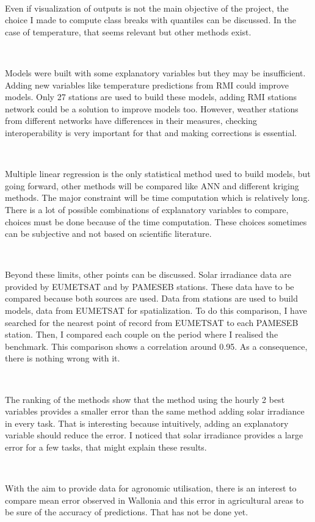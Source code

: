 \documentclass[12pt,twoside]{reedthesis}
\theoremstyle{definition}
\theoremstyle{definition}
\theoremstyle{definition}
\theoremstyle{remark}
\begin{document}
~

Even if visualization of outputs is not the main objective of the
project, the choice I made to compute class breaks with quantiles can be
discussed. In the case of temperature, that seems relevant but other
methods exist.

~

Models were built with some explanatory variables but they may be
insufficient. Adding new variables like temperature predictions from RMI
could improve models. Only 27 stations are used to build these models,
adding RMI stations network could be a solution to improve models too.
However, weather stations from different networks have differences in
their measures, checking interoperability is very important for that and
making corrections is essential.

~

Multiple linear regression is the only statistical method used to build
models, but going forward, other methods will be compared like ANN and
different kriging methods. The major constraint will be time computation
which is relatively long. There is a lot of possible combinations of
explanatory variables to compare, choices must be done because of the
time computation. These choices sometimes can be subjective and not
based on scientific literature.

~

Beyond these limits, other points can be discussed. Solar irradiance
data are provided by EUMETSAT and by PAMESEB stations. These data have
to be compared because both sources are used. Data from stations are
used to build models, data from EUMETSAT for spatialization. To do this
comparison, I have searched for the nearest point of record from
EUMETSAT to each PAMESEB station. Then, I compared each couple on the
period where I realised the benchmark. This comparison shows a
correlation around 0.95. As a consequence, there is nothing wrong with
it.

~

The ranking of the methods show that the method using the hourly 2 best
variables provides a smaller error than the same method adding solar
irradiance in every task. That is interesting because intuitively,
adding an explanatory variable should reduce the error. I noticed that
solar irradiance provides a large error for a few tasks, that might
explain these results.

~

With the aim to provide data for agronomic utilisation, there is an
interest to compare mean error observed in Wallonia and this error in
agricultural areas to be sure of the accuracy of predictions. That has
not be done yet.
\end{document}
